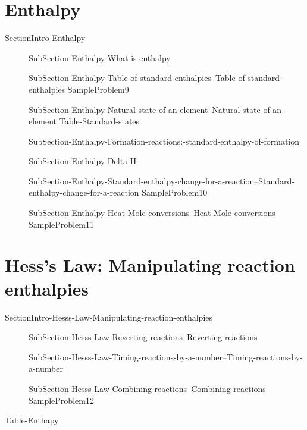 \documentclass[main.tex]{subfiles}
\newcommand\chapterlabel{Ch-thermochemistry}\setcounter{figurenewcounter}{0}\setcounter{tablenewcounter}{0}\setcounter{formulanewcounter}{0}
\begin{document}
  \section{Enthalpy}
{SectionIntro-Enthalpy}
\sloppy\begin{description}
  \item[] 
  {SubSection-Enthalpy-What-is-enthalpy}
\item[] 
  {SubSection-Enthalpy-Table-of-standard-enthalpies--Table-of-standard-enthalpies}
   {SampleProblem9}
\item[]
 {SubSection-Enthalpy-Natural-state-of-an-element--Natural-state-of-an-element}
   {Table-Standard-states}
\item[] 
  {SubSection-Enthalpy-Formation-reactions:-standard-enthalpy-of-formation}
 \item[]
  {SubSection-Enthalpy-Delta-H}
\item[] 
  {SubSection-Enthalpy-Standard-enthalpy-change-for-a-reaction--Standard-enthalpy-change-for-a-reaction}
   {SampleProblem10}
  \item[] 
    {SubSection-Enthalpy-Heat-Mole-conversions--Heat-Mole-conversions}
   {SampleProblem11}
  \end{description}
  
  
 \section{Hess's Law: Manipulating reaction enthalpies }
{SectionIntro-Hesss-Law-Manipulating-reaction-enthalpies}
\sloppy\begin{description}
\item[] 
  {SubSection-Hesss-Law-Reverting-reactions--Reverting-reactions}
 \item[] 
 {SubSection-Hesss-Law-Timing-reactions-by-a-number--Timing-reactions-by-a-number}
  \item[] 
  {SubSection-Hesss-Law-Combining-reactions--Combining-reactions} 
   {SampleProblem12}
\end{description}



   {Table-Enthapy}
\end{document}
